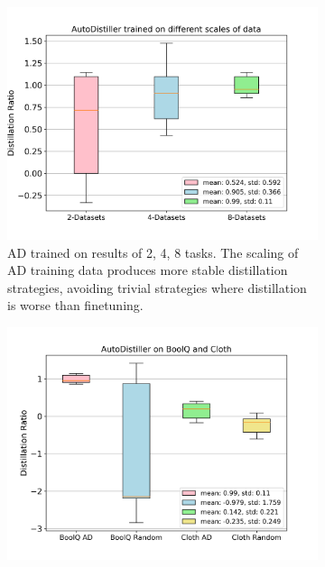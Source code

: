 \documentclass[11pt]{article}
\begin{document}
\begin{figure}[!tb]
    \centering
    \begin{subfigure}[b]{0.35\textwidth}
    \centering
    \includegraphics[width=1.0\textwidth]{pics/autodistiller_xscale_scracth.png}
    \caption{AD trained on results of 2, 4, 8 tasks.
    The scaling of AD training data produces more stable distillation strategies, avoiding trivial strategies where distillation is worse than finetuning.
    }
    \label{fig:AD:more-data}
    \end{subfigure}
    \begin{subfigure}[b]{0.35\textwidth}
    \centering
    \includegraphics[width=1.0\textwidth]{pics/AD_prediction_scracth.png}

\end{subfigure}
\end{figure}
\end{document}

